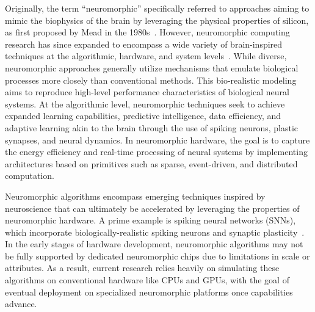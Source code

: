 Originally, the term ``neuromorphic'' specifically referred to approaches aiming to mimic the biophysics of the brain by leveraging the physical properties of silicon, as first proposed by Mead in the 1980s~\cite{Mead:1990hw}. However, neuromorphic computing research has since expanded to encompass a wide variety of brain-inspired techniques at the algorithmic, hardware, and system levels~\cite{schuman2017survey}. While diverse, neuromorphic approaches generally utilize mechanisms that emulate biological processes more closely than conventional methods. This bio-realistic modeling aims to reproduce high-level performance characteristics of biological neural systems. At the algorithmic level, neuromorphic techniques seek to achieve expanded learning capabilities, predictive intelligence, data efficiency, and adaptive learning akin to the brain through the use of spiking neurons, plastic synapses, and neural dynamics. In neuromorphic hardware, the goal is to capture the energy efficiency and real-time processing of neural systems by implementing architectures based on primitives such as sparse, event-driven, and distributed computation.


Neuromorphic algorithms encompass emerging techniques inspired by neuroscience that can ultimately be accelerated by leveraging the properties of neuromorphic hardware. A prime example is spiking neural networks (SNNs), which incorporate biologically-realistic spiking neurons and synaptic plasticity~\cite{?}. In the early stages of hardware development, neuromorphic algorithms may not be fully supported by dedicated neuromorphic chips due to limitations in scale or attributes. As a result, current research relies heavily on simulating these algorithms on conventional hardware like CPUs and GPUs, with the goal of eventual deployment on specialized neuromorphic platforms once capabilities advance.

